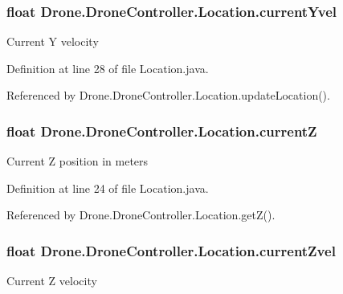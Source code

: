 \subsubsection[{current\+Yvel}]{\setlength{\rightskip}{0pt plus 5cm}float Drone.\+Drone\+Controller.\+Location.\+current\+Yvel\hspace{0.3cm}{\ttfamily [private]}}\label{class_drone_1_1_drone_controller_1_1_location_adff5260059e632576967773ffd15f219}
Current Y velocity 

Definition at line 28 of file Location.\+java.



Referenced by Drone.\+Drone\+Controller.\+Location.\+update\+Location().

\hypertarget{class_drone_1_1_drone_controller_1_1_location_a83d271c394653007f31f7a5a31dcb2a6}{}
\subsubsection[{current\+Z}]{\setlength{\rightskip}{0pt plus 5cm}float Drone.\+Drone\+Controller.\+Location.\+current\+Z\hspace{0.3cm}{\ttfamily [private]}}\label{class_drone_1_1_drone_controller_1_1_location_a83d271c394653007f31f7a5a31dcb2a6}
Current Z position in meters 

Definition at line 24 of file Location.\+java.



Referenced by Drone.\+Drone\+Controller.\+Location.\+get\+Z().

\hypertarget{class_drone_1_1_drone_controller_1_1_location_a64772870a1e3318223eb6998fc8b8b5a}{}
\subsubsection[{current\+Zvel}]{\setlength{\rightskip}{0pt plus 5cm}float Drone.\+Drone\+Controller.\+Location.\+current\+Zvel\hspace{0.3cm}{\ttfamily [private]}}\label{class_drone_1_1_drone_controller_1_1_location_a64772870a1e3318223eb6998fc8b8b5a}
Current Z velocity 

